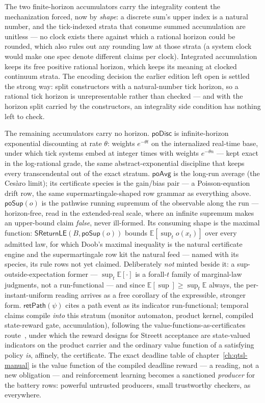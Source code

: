 The two finite-horizon accumulators carry the integrality content
the mechanization forced, now by \emph{shape}: a discrete sum's
upper index is a natural number, and the tick-indexed strata that
consume summed accumulation are unitless --- no clock exists there
against which a rational horizon could be rounded, which also rules
out any rounding law at those strata (a system clock would make one
spec denote different claims per clock). Integrated accumulation
keeps its free positive rational horizon, which keeps its meaning at
clocked continuum strata. The encoding decision the earlier edition
left open is settled the strong way: split constructors with a
natural-number tick horizon, so a rational tick horizon is
unrepresentable rather than checked --- and with the horizon split
carried by the constructors, an integrality side condition has
nothing left to check.

The remaining accumulators carry no horizon.
$\mathsf{poDisc}$ is infinite-horizon
exponential discounting at rate $\theta$: weights $e^{-\theta t}$ on
the internalized real-time base, under which tick systems embed at
integer times with weights $e^{-\theta n}$ --- kept exact in the
log-rational grade, the same abstract-exponential discipline that
keeps every transcendental out of the exact stratum.
$\mathsf{poAvg}$ is the long-run average (the Ces\`aro limit); its
certificate species is the
gain/bias pair --- a Poisson-equation drift row, the same
supermartingale-shaped row grammar as everything above.
$\mathsf{poSup}(o)$ is the pathwise running supremum of the
observable along the run --- horizon-free, read in the extended-real
scale, where an infinite supremum makes an upper-bound claim
\emph{false}, never ill-formed. Its consuming shape is the maximal
function: $\mathsf{SReturnLE}(B, \mathsf{poSup}(o))$ bounds
$\mathbb{E}[\sup_t o(x_t)]$ over every admitted law, for which
Doob's maximal inequality is the natural certificate engine and the
supermartingale row kit the natural feed --- named with its species,
its rule rows not yet claimed. Deliberately \emph{not} minted beside
it: a sup-outside-expectation former --- $\sup_t \mathbb{E}[\cdot]$
is a forall-$t$ family of marginal-law judgments, not a
run-functional --- and since
$\mathbb{E}[\sup] \ge \sup_t \mathbb{E}$ always, the
per-instant-uniform reading arrives as a free corollary of the
expressible, stronger form.
$\mathsf{retPath}(\psi)$ cites a path event as its indicator
run-functional; temporal claims compile \emph{into} this stratum
(monitor automaton, product kernel, compiled state-reward gate,
accumulation), following the value-functions-as-certificates
route~\cite{abate26b}, under which the reward designs for Streett
acceptance are state-valued indicators on the product carrier and
the ordinary value function of a satisfying policy \emph{is},
affinely, the certificate. The exact deadline table of
chapter~\ref{ch:qtsl-manual} is the value function of the
compiled deadline reward --- a reading, not a new obligation --- and
reinforcement learning becomes a sanctioned \emph{producer} for the
battery rows: powerful untrusted producers, small trustworthy
checkers, as everywhere.


